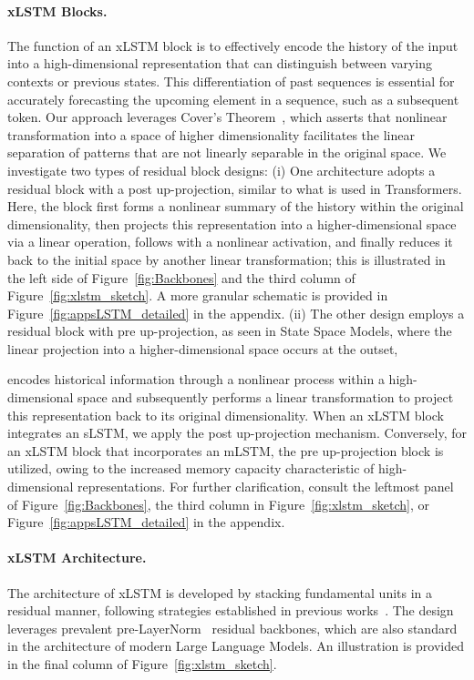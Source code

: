 \paragraph{xLSTM Blocks.}
\label{sec:xLSTMblock}
The function of an xLSTM block is to effectively encode the history of the input into a high-dimensional representation that can distinguish between varying contexts or previous states. This differentiation of past sequences is essential for accurately forecasting the upcoming element in a sequence, such as a subsequent token. Our approach leverages Cover’s Theorem~\citep{Cover:65}, which asserts that nonlinear transformation into a space of higher dimensionality facilitates the linear separation of patterns that are not linearly separable in the original space. We investigate two types of residual block designs: (i) One architecture adopts a residual block with a post up-projection, similar to what is used in Transformers. Here, the block first forms a nonlinear summary of the history within the original dimensionality, then projects this representation into a higher-dimensional space via a linear operation, follows with a nonlinear activation, and finally reduces it back to the initial space by another linear transformation; this is illustrated in the left side of Figure~\ref{fig:Backbones} and the third column of Figure~\ref{fig:xlstm_sketch}. 
A more granular schematic is provided in Figure~\ref{fig:appsLSTM_detailed} in the appendix. (ii) The other design employs a residual block with pre up-projection, as seen in State Space Models, where the linear projection into a higher-dimensional space occurs at the outset,

encodes historical information through a nonlinear process within a high-dimensional space and subsequently performs a linear transformation to project this representation back to its original dimensionality. When an xLSTM block integrates an sLSTM, we apply the post up-projection mechanism. Conversely, for an xLSTM block that incorporates an mLSTM, the pre up-projection block is utilized, owing to the increased memory capacity characteristic of high-dimensional representations. For further clarification, consult the leftmost panel of Figure~\ref{fig:Backbones}, the third column in Figure~\ref{fig:xlstm_sketch}, or Figure~\ref{fig:appsLSTM_detailed} in the appendix.

\paragraph{xLSTM Architecture. }
\label{sec:xLSTMarchitecure}
The architecture of xLSTM is developed by stacking fundamental units in a residual manner, following strategies established in previous works~\citep{Srivastava:15,He:16}. The design leverages prevalent pre-LayerNorm~\citep{Ba:16b} residual backbones, which are also standard in the architecture of modern Large Language Models. An illustration is provided in the final column of Figure~\ref{fig:xlstm_sketch}.

